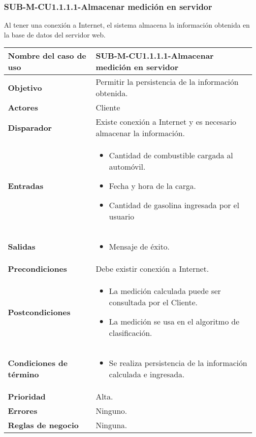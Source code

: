 \subsubsection{SUB-M-CU1.1.1.1-Almacenar medición en servidor}\label{SUB-M-CU1.1.1.1}
Al tener una conexión a Internet, el sistema almacena la información obtenida en la base de datos del servidor web.

\begin{longtable}{|J{5cm}|J{10.3cm}|}
	\hline
	\textbf{Nombre del caso de uso} &
		SUB-M-CU1.1.1.1-Almacenar medición en servidor \\ \hline
	\textbf{Objetivo} &
		Permitir la persistencia de la información obtenida. \\ \hline
	\textbf{Actores} &
		Cliente \\ \hline 
	\textbf{Disparador} & 
		Existe conexión a Internet y es necesario almacenar la información. \\ \hline 
	\textbf{Entradas} & 
		\begin{itemize}
				\item Cantidad de combustible cargada al automóvil.
				\item Fecha y hora de la carga.
				\item Cantidad de gasolina ingresada por el usuario
		\end{itemize}\\ \hline 
	\textbf{Salidas} & 
		\begin{itemize}
			\item Mensaje de éxito.
		\end{itemize} \\ \hline
	\textbf{Precondiciones} &
		Debe existir conexión a Internet.\\ \hline
	\textbf{Postcondiciones} &
		\begin{itemize}
			\item La medición calculada puede ser consultada por el Cliente.
			\item La medición se usa en el algoritmo de clasificación.
		\end{itemize} \\ \hline
	\textbf{Condiciones de término} & 
		\begin{itemize}
			\item Se realiza persistencia de la información calculada e ingresada.
		\end{itemize} \\ \hline 
	\textbf{Prioridad} & 
		Alta. \\ \hline
	\textbf{Errores} & Ninguno.
		\\ \hline
	\textbf{Reglas de negocio} & Ninguna.
		 \\ \hline
\end{longtable}

